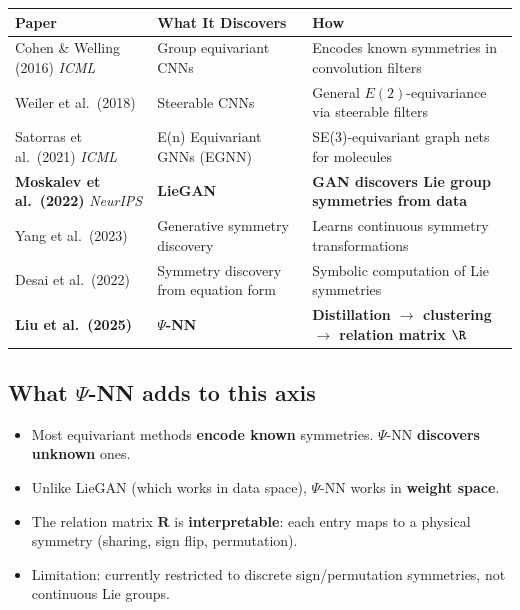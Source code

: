 \documentclass[11pt,a4paper]{article}
\begin{document}
\begin{center}
\renewcommand{\arraystretch}{1.3}
\begin{tabular}{@{}p{3.8cm} p{3.5cm} p{5.2cm}@{}}
\toprule
\textbf{Paper} & \textbf{What It Discovers} & \textbf{How} \\
\midrule
Cohen \& Welling (2016) \textit{ICML} & Group equivariant CNNs & Encodes known symmetries in convolution filters \\
\addlinespace
Weiler et al.\ (2018) & Steerable CNNs & General $E(2)$-equivariance via steerable filters \\
\addlinespace
Satorras et al.\ (2021) \textit{ICML} & E(n) Equivariant GNNs (EGNN) & SE(3)-equivariant graph nets for molecules \\
\addlinespace
\textbf{Moskalev et al.\ (2022)} \textit{NeurIPS} & \textbf{LieGAN} & \textbf{GAN discovers Lie group symmetries from data} \\
\addlinespace
Yang et al.\ (2023) & Generative symmetry discovery & Learns continuous symmetry transformations \\
\addlinespace
Desai et al.\ (2022) & Symmetry discovery from equation form & Symbolic computation of Lie symmetries \\
\addlinespace
\textbf{Liu et al.\ (2025)} & \textbf{$\Psi$-NN} & \textbf{Distillation $\to$ clustering $\to$ relation matrix $\R$} \\
\bottomrule
\end{tabular}
\end{center}

\subsection{What $\Psi$-NN adds to this axis}

\begin{tcolorbox}[colback=structure!5,colframe=structure!70!black,title={\small $\Psi$-NN's unique contribution}]
\small
\begin{itemize}[leftmargin=1.2em,itemsep=1pt]
\item Most equivariant methods \textbf{encode known} symmetries. $\Psi$-NN \textbf{discovers unknown} ones.
\item Unlike LieGAN (which works in data space), $\Psi$-NN works in \textbf{weight space}.
\item The relation matrix $\mathbf{R}$ is \textbf{interpretable}: each entry maps to a physical symmetry (sharing, sign flip, permutation).
\item Limitation: currently restricted to discrete sign/permutation symmetries, not continuous Lie groups.
\end{itemize}
\end{tcolorbox}
\end{document}
